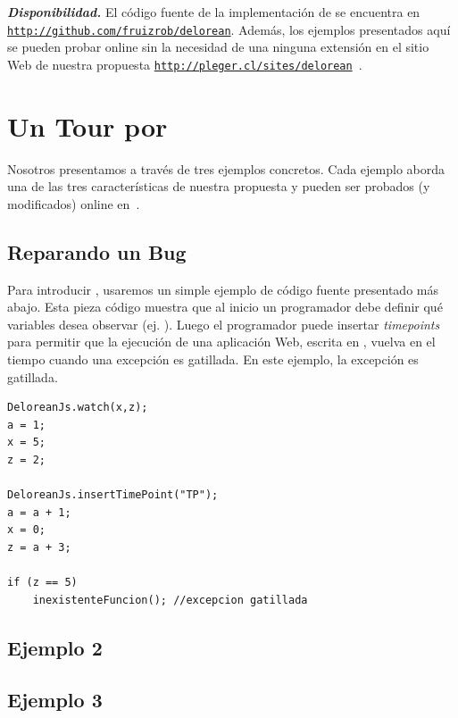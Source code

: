\documentclass[conference]{IEEEtran}
\begin{document}
\smallskip

{\bf {\em Disponibilidad.}} El c\'odigo fuente de la implementaci\'on de \deloreanjs se encuentra en {\tt \url{http://github.com/fruizrob/delorean}}. Adem\'as, los ejemplos presentados aqu\'i se pueden probar online sin la necesidad de una ninguna extensi\'on en el sitio Web de nuestra propuesta {\tt \url{http://pleger.cl/sites/delorean}}~\cite{deloreanjs}.

\section{Un Tour por \deloreanjs}
\label{sec:tour}

Nosotros presentamos \deloreanjs a trav\'es de tres ejemplos concretos. Cada ejemplo aborda una de las tres caracter\'isticas de nuestra propuesta y pueden ser probados (y modificados) online en~\cite{deloreanjs}.     

\subsection{Reparando un Bug}
\label{sec:tour1}

Para introducir \deloreanjs, usaremos un simple ejemplo de c\'odigo fuente presentado m\'as abajo. Esta pieza c\'odigo muestra que al inicio un programador debe definir qu\'e variables desea observar (ej. ). Luego el programador puede insertar    {\em timepoints} para permitir que la ejecuci\'on de una aplicaci\'on Web, escrita en \javascript, vuelva en el tiempo cuando una excepci\'on es gatillada. En este ejemplo, la excepci\'on es gatillada.  

\begin{lstlisting}[linewidth=\columnwidth]
DeloreanJs.watch(x,z);
a = 1;
x = 5;
z = 2;

DeloreanJs.insertTimePoint("TP");
a = a + 1;
x = 0;
z = a + 3;

if (z == 5)
	inexistenteFuncion(); //excepcion gatillada
\end{lstlisting}

\subsection{Ejemplo 2}
\label{sec:tour2}


\subsection{Ejemplo 3}
\label{sec:tour3}
\end{document}
